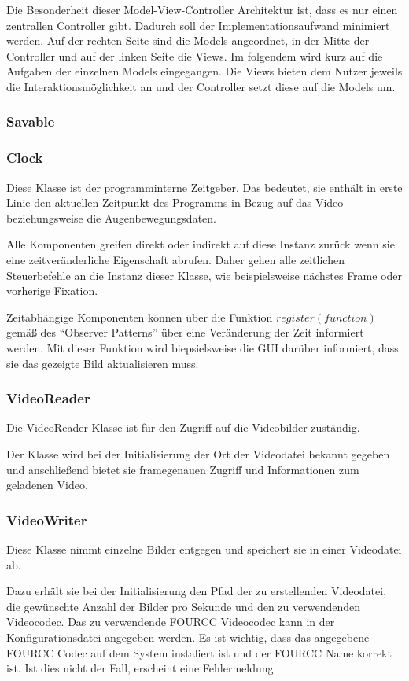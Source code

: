 \documentclass[a4paper,draft]{scrartcl}
\begin{document}
  Die Besonderheit dieser Model-View-Controller Architektur ist, dass es nur einen zentrallen Controller gibt. Dadurch soll der Implementationsaufwand minimiert werden. Auf der rechten Seite sind die Models angeordnet, in der Mitte der Controller und auf der linken Seite die Views. Im folgendem wird kurz auf die Aufgaben der einzelnen Models eingegangen. Die Views bieten dem Nutzer jeweils die Interaktionsmöglichkeit an und der Controller setzt diese auf die Models um.

\subsubsection{Savable}

\subsubsection{Clock}
Diese Klasse ist der programminterne Zeitgeber. 
Das bedeutet, sie enthält in erste Linie den aktuellen Zeitpunkt des Programms in Bezug auf das Video beziehungsweise die Augenbewegungsdaten.

Alle Komponenten greifen direkt oder indirekt auf diese Instanz zurück wenn sie eine zeitveränderliche Eigenschaft abrufen. Daher gehen alle zeitlichen Steuerbefehle an die Instanz dieser Klasse, wie beispielsweise nächstes Frame oder vorherige Fixation. 

Zeitabhängige Komponenten können über die Funktion $register(function)$ gemäß des "`Observer Patterns"' über eine Veränderung der Zeit informiert werden.
Mit dieser Funktion wird biepsielsweise die GUI darüber informiert, dass sie das gezeigte Bild aktualisieren muss.

\subsubsection{VideoReader}
Die VideoReader Klasse ist für den Zugriff auf die Videobilder zuständig.

Der Klasse wird bei der Initialisierung der Ort der Videodatei bekannt gegeben und anschließend bietet sie framegenauen Zugriff und Informationen zum geladenen Video.

\subsubsection{VideoWriter}
Diese Klasse nimmt einzelne Bilder entgegen und speichert sie in einer Videodatei ab.

Dazu erhält sie bei der Initialisierung den Pfad der zu erstellenden Videodatei, die gewünschte Anzahl der Bilder pro Sekunde und den zu verwendenden Videocodec.
Das zu verwendende FOURCC Videocodec kann in der Konfigurationsdatei angegeben werden. Es ist wichtig, dass das angegebene FOURCC Codec auf dem System instaliert ist und der FOURCC Name korrekt ist. Ist dies nicht der Fall, erscheint eine Fehlermeldung.
\end{document}
